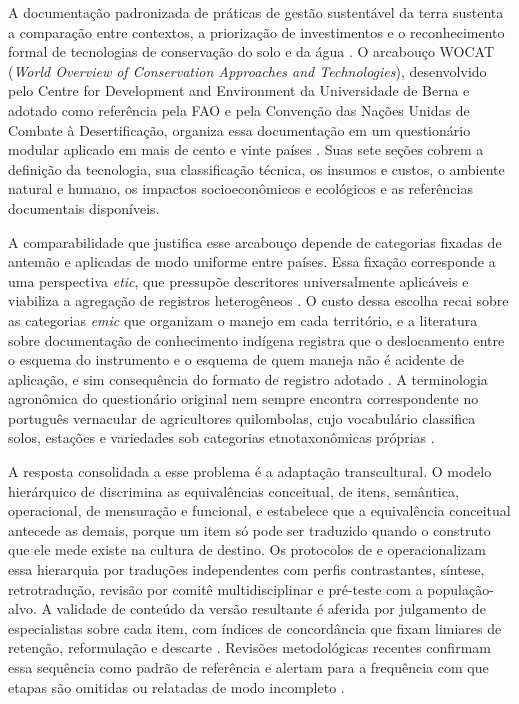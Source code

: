 \documentclass[preprint,authoryear,12pt]{elsarticle}
\begin{document}
A documentação padronizada de práticas de gestão sustentável da terra sustenta a comparação entre contextos, a priorização de investimentos e o reconhecimento formal de tecnologias de conservação do solo e da água \citep{Liniger2011,Schwilch2011}. O arcabouço WOCAT (\textit{World Overview of Conservation Approaches and Technologies}), desenvolvido pelo Centre for Development and Environment da Universidade de Berna e adotado como referência pela FAO e pela Convenção das Nações Unidas de Combate à Desertificação, organiza essa documentação em um questionário modular aplicado em mais de cento e vinte países \citep{Liniger2019,WOCAT2023}. Suas sete seções cobrem a definição da tecnologia, sua classificação técnica, os insumos e custos, o ambiente natural e humano, os impactos socioeconômicos e ecológicos e as referências documentais disponíveis.

A comparabilidade que justifica esse arcabouço depende de categorias fixadas de antemão e aplicadas de modo uniforme entre países. Essa fixação corresponde a uma perspectiva \textit{etic}, que pressupõe descritores universalmente aplicáveis e viabiliza a agregação de registros heterogêneos \citep{Pike1967}. O custo dessa escolha recai sobre as categorias \textit{emic} que organizam o manejo em cada território, e a literatura sobre documentação de conhecimento indígena registra que o deslocamento entre o esquema do instrumento e o esquema de quem maneja não é acidente de aplicação, e sim consequência do formato de registro adotado \citep{Agrawal2002}. A terminologia agronômica do questionário original nem sempre encontra correspondente no português vernacular de agricultores quilombolas, cujo vocabulário classifica solos, estações e variedades sob categorias etnotaxonômicas próprias \citep{Rist2006,Quave2014}.

A resposta consolidada a esse problema é a adaptação transcultural. O modelo hierárquico de \citet{Herdman1999} discrimina as equivalências conceitual, de itens, semântica, operacional, de mensuração e funcional, e estabelece que a equivalência conceitual antecede as demais, porque um item só pode ser traduzido quando o construto que ele mede existe na cultura de destino. Os protocolos de \citet{Guillemin1993} e \citet{Beaton2000} operacionalizam essa hierarquia por traduções independentes com perfis contrastantes, síntese, retrotradução, revisão por comitê multidisciplinar e pré-teste com a população-alvo. A validade de conteúdo da versão resultante é aferida por julgamento de especialistas sobre cada item, com índices de concordância que fixam limiares de retenção, reformulação e descarte \citep{Hernandez-Nieto2002,Cassepp-Borges2010}. Revisões metodológicas recentes confirmam essa sequência como padrão de referência e alertam para a frequência com que etapas são omitidas ou relatadas de modo incompleto \citep{Borsa2018,deSousa2024}.
\end{document}
